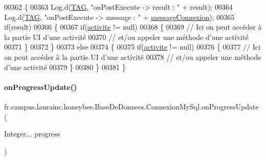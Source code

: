 \begin{DoxyCode}
00362         \{
00363             Log.d(\hyperlink{classfr_1_1campus_1_1laurainc_1_1honeybee_1_1_base_de_donnees_ae800d867b3e423dd139e982736ab5587}{TAG}, \textcolor{stringliteral}{"onPostExecute -> result : "} + result);
00364             Log.d(\hyperlink{classfr_1_1campus_1_1laurainc_1_1honeybee_1_1_base_de_donnees_ae800d867b3e423dd139e982736ab5587}{TAG}, \textcolor{stringliteral}{"onPostExecute -> message : "} + \hyperlink{classfr_1_1campus_1_1laurainc_1_1honeybee_1_1_base_de_donnees_1_1_connexion_my_sql_a8db83810efa310195fdd72bcbac2843f}{messageConnexion});
00365             \textcolor{keywordflow}{if}(result)
00366             \{
00367                 \textcolor{keywordflow}{if}(\hyperlink{classfr_1_1campus_1_1laurainc_1_1honeybee_1_1_base_de_donnees_aad4fd29f29916bc4277fa16262d19431}{activite} != null)
00368                 \{
00369                     \textcolor{comment}{// Ici on peut accéder à la partie UI d'une activité}
00370                     \textcolor{comment}{// et/ou appeler une méthode d'une activité}
00371                 \}
00372             \}
00373             \textcolor{keywordflow}{else}
00374             \{
00375                 \textcolor{keywordflow}{if}(\hyperlink{classfr_1_1campus_1_1laurainc_1_1honeybee_1_1_base_de_donnees_aad4fd29f29916bc4277fa16262d19431}{activite} != null)
00376                 \{
00377                     \textcolor{comment}{// Ici on peut accéder à la partie UI d'une activité}
00378                     \textcolor{comment}{// et/ou appeler une méthode d'une activité}
00379                 \}
00380             \}
00381         \}
\end{DoxyCode}
\mbox{\label{classfr_1_1campus_1_1laurainc_1_1honeybee_1_1_base_de_donnees_1_1_connexion_my_sql_ab9c34193cf45af727a5f5de4b27b1a46}} 
\paragraph{\texorpdfstring{on\+Progress\+Update()}{onProgressUpdate()}}
{\footnotesize\ttfamily fr.\+campus.\+laurainc.\+honeybee.\+Base\+De\+Donnees.\+Connexion\+My\+Sql.\+on\+Progress\+Update (\begin{DoxyParamCaption}\item[{Integer...}]{progress }\end{DoxyParamCaption})\hspace{0.3cm}{\ttfamily [protected]}}


